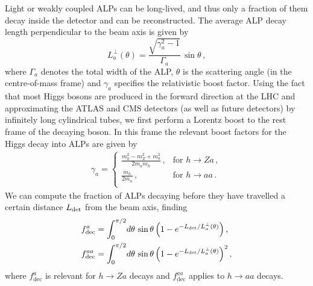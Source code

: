 Light or weakly coupled ALPs can be long-lived, and thus only a fraction of them decay inside the detector and can be reconstructed. The average ALP decay length perpendicular to the beam axis is given by
%
\begin{equation}\label{eq:Lperp}
   L_a^\perp(\theta) = \frac{\sqrt{\gamma_a^2 - 1}}{\Gamma_a}\,\sin\theta \,, 
\end{equation}
%
where $\Gamma_a$ denotes the total width of the ALP, $\theta$ is the scattering angle (in the centre-of-mass frame) and $\gamma_a$ specifies the relativistic boost factor. Using the fact that most Higgs bosons are produced in the forward direction at the LHC and approximating the ATLAS and CMS detectors (as well as future detectors) by infinitely long cylindrical tubes, we first perform a Lorentz boost to the rest frame of the decaying boson. In this frame the relevant boost factors for the Higgs decay into ALPs are given by
\begin{align}
\gamma_a=\begin{cases}\displaystyle{ \frac{m_h^2-m_Z^2+m_a^2}{2m_am_h}}\,,& \text{for}\,\, h \to Z a\,,\\[14pt]
\displaystyle \frac{m_h}{2m_a}\,,&\text{for}\,\, h \to aa\,.\\
\end{cases}
\end{align}
%
We can compute the fraction of ALPs decaying before they have travelled a certain distance $L_{\rm det}$ from the beam axis, finding 
%
\begin{equation}\label{eq:ffactors}
\begin{aligned}
   f_{\rm dec}^{a} &= \int_0^{\pi/2}\!d\theta \,  \sin\theta
    \left( 1 - e^{-L_{\rm det}/L_a^\perp(\theta)} \right) , \\
   f_{\rm dec}^{aa} &= \int_0^{\pi/2}\!d\theta \,  \sin\theta
    \left( 1 - e^{-L_{\rm det}/L_a^\perp(\theta)} \right)^2,
\end{aligned}
\end{equation} 
%
where $f^a_\text{dec}$ is relevant for $h \to Z a$ decays and $f^{aa}_\text{dec}$ applies to $h\to aa$ decays. 

